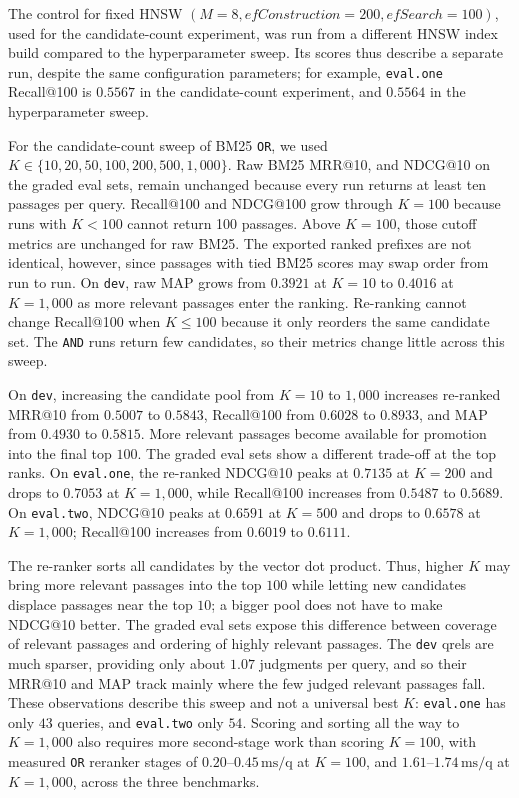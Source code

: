 \documentclass[11pt]{article}
\begin{document}
The control for fixed HNSW $(M=8,\mathit{efConstruction}=200,\mathit{efSearch}=100)$, used for the candidate-count experiment, was run from a different HNSW index build compared to the hyperparameter sweep. Its scores thus describe a separate run, despite the same configuration parameters; for example, \texttt{eval.one} Recall@100 is $0.5567$ in the candidate-count experiment, and $0.5564$ in the hyperparameter sweep.

For the candidate-count sweep of BM25 \texttt{OR}, we used $K \in \{10,20,50,100,200,500,1{,}000\}$. Raw BM25 MRR@10, and NDCG@10 on the graded eval sets, remain unchanged because every run returns at least ten passages per query. Recall@100 and NDCG@100 grow through $K=100$ because runs with $K<100$ cannot return 100 passages. Above $K=100$, those cutoff metrics are unchanged for raw BM25. The exported ranked prefixes are not identical, however, since passages with tied BM25 scores may swap order from run to run. On \texttt{dev}, raw MAP grows from $0.3921$ at $K=10$ to $0.4016$ at $K=1{,}000$ as more relevant passages enter the ranking. Re-ranking cannot change Recall@100 when $K\leq100$ because it only reorders the same candidate set. The \texttt{AND} runs return few candidates, so their metrics change little across this sweep.

On \texttt{dev}, increasing the candidate pool from $K=10$ to $1{,}000$ increases re-ranked MRR@10 from $0.5007$ to $0.5843$, Recall@100 from $0.6028$ to $0.8933$, and MAP from $0.4930$ to $0.5815$. More relevant passages become available for promotion into the final top $100$. The graded eval sets show a different trade-off at the top ranks. On \texttt{eval.one}, the re-ranked NDCG@10 peaks at $0.7135$ at $K=200$ and drops to $0.7053$ at $K=1{,}000$, while Recall@100 increases from $0.5487$ to $0.5689$. On \texttt{eval.two}, NDCG@10 peaks at $0.6591$ at $K=500$ and drops to $0.6578$ at $K=1{,}000$; Recall@100 increases from $0.6019$ to $0.6111$.

The re-ranker sorts all candidates by the vector dot product. Thus, higher $K$ may bring more relevant passages into the top $100$ while letting new candidates displace passages near the top $10$; a bigger pool does not have to make NDCG@10 better. The graded eval sets expose this difference between coverage of relevant passages and ordering of highly relevant passages. The \texttt{dev} qrels are much sparser, providing only about $1.07$ judgments per query, and so their MRR@10 and MAP track mainly where the few judged relevant passages fall. These observations describe this sweep and not a universal best $K$: \texttt{eval.one} has only $43$ queries, and \texttt{eval.two} only $54$. Scoring and sorting all the way to $K=1{,}000$ also requires more second-stage work than scoring $K=100$, with measured \texttt{OR} reranker stages of $0.20$--$0.45\,\text{ms/q}$ at $K=100$, and $1.61$--$1.74\,\text{ms/q}$ at $K=1{,}000$, across the three benchmarks.
\end{document}
